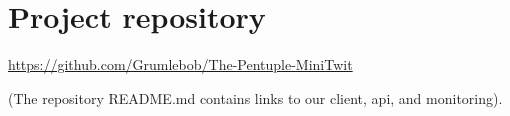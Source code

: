 \section{Project repository}
\label{appn:A}
\href{https://github.com/Grumlebob/The-Pentuple-MiniTwit}{https://github.com/Grumlebob/The-Pentuple-MiniTwit}

(The repository README.md contains links to our client, api, and monitoring).